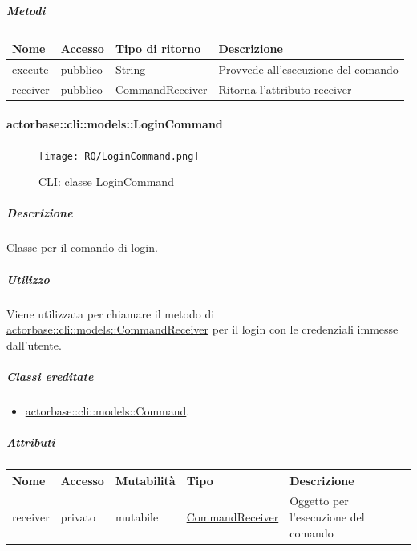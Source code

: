 \documentclass{scalatekids-article}
\begin{document}
\subparagraph{Metodi}

\begin{tabular}{| p{3cm} | p{1.5cm} | p{3.5cm} | p{9cm} |}
  \hline
  Nome & Accesso & Tipo di ritorno & Descrizione\\
  \hline
  execute & pubblico & String & Provvede all'esecuzione del comando\\
  \hline
  receiver & pubblico & \hyperref[sec:actorbase::cli::models::CommandReceiver]{CommandReceiver} & Ritorna l'attributo receiver\\
  \hline
\end{tabular}

\paragraph{actorbase::cli::models::LoginCommand}
\label{sec:actorbase::cli::models::LoginCommand}

\begin{figure}[H]
  \begin{center}
    \texttt{[image: RQ/LoginCommand.png]}
    \caption{CLI: classe LoginCommand}
  \end{center}
\end{figure}

\subparagraph{Descrizione}

Classe per il comando di login.

\subparagraph{Utilizzo}

Viene utilizzata per chiamare il metodo di
\hyperref[sec:actorbase::cli::models::CommandReceiver]{actorbase::cli::models::CommandReceiver} per il login con le credenziali
immesse dall'utente.

\subparagraph{Classi ereditate}

\begin{itemize}
\item \hyperref[sec:actorbase::cli::models::Command]{actorbase::cli::models::Command}.
\end{itemize}

\subparagraph{Attributi}

\begin{tabular}{| p{1cm} | p{1.5cm} | p{2cm} | p{4cm} | p{8.5cm} |}
  \hline
  Nome & Accesso & Mutabilità & Tipo & Descrizione\\
  \hline
  receiver & privato & mutabile & \hyperref[sec:actorbase::cli::models::CommandReceiver]{CommandReceiver} & Oggetto per l'esecuzione del comando\\
  \hline
\end{tabular}
\end{document}
